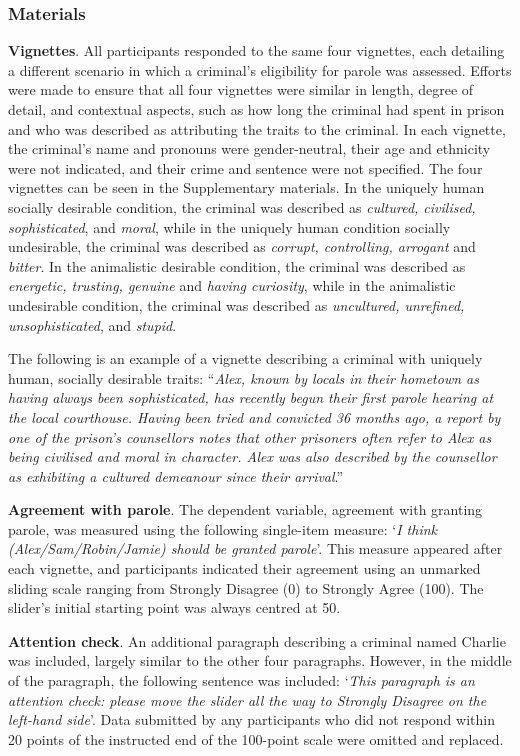 \documentclass[
]{article}
\begin{document}
\hypertarget{materials-4}{%
\subsubsection{Materials}\label{materials-4}}

\textbf{Vignettes}. All participants responded to the same four vignettes, each detailing a different scenario in which a criminal's eligibility for parole was assessed. Efforts were made to ensure that all four vignettes were similar in length, degree of detail, and contextual aspects, such as how long the criminal had spent in prison and who was described as attributing the traits to the criminal. In each vignette, the criminal's name and pronouns were gender-neutral, their age and ethnicity were not indicated, and their crime and sentence were not specified. The four vignettes can be seen in the Supplementary materials. In the uniquely human socially desirable condition, the criminal was described as \emph{cultured, civilised, sophisticated}, and \emph{moral}, while in the uniquely human condition socially undesirable, the criminal was described as \emph{corrupt, controlling, arrogant} and \emph{bitter}. In the animalistic desirable condition, the criminal was described as \emph{energetic, trusting, genuine} and \emph{having curiosity}, while in the animalistic undesirable condition, the criminal was described as \emph{uncultured, unrefined, unsophisticated}, and \emph{stupid}.

The following is an example of a vignette describing a criminal with uniquely human, socially desirable traits: ``\emph{Alex, known by locals in their hometown as having always been sophisticated, has recently begun their first parole hearing at the local courthouse. Having been tried and convicted 36 months ago, a report by one of the prison's counsellors notes that other prisoners often refer to Alex as being civilised and moral in character. Alex was also described by the counsellor as exhibiting a cultured demeanour since their arrival}.''

\textbf{Agreement with parole}. The dependent variable, agreement with granting parole, was measured using the following single-item measure: `\emph{I think (Alex/Sam/Robin/Jamie) should be granted parole}'. This measure appeared after each vignette, and participants indicated their agreement using an unmarked sliding scale ranging from Strongly Disagree (0) to Strongly Agree (100). The slider's initial starting point was always centred at 50.

\textbf{Attention check}. An additional paragraph describing a criminal named Charlie was included, largely similar to the other four paragraphs. However, in the middle of the paragraph, the following sentence was included: `\emph{This paragraph is an attention check: please move the slider all the way to Strongly Disagree on the left-hand side}'. Data submitted by any participants who did not respond within 20 points of the instructed end of the 100-point scale were omitted and replaced.
\end{document}
